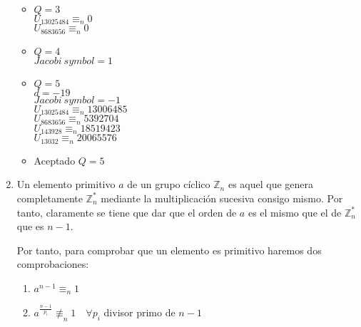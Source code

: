 \begin{enumerate}
\begin{itemize}
			\item $Q = 3$ \\
			$U_{13025484} \equiv_n 0$ \\
			$U_{8683656} \equiv_n 0$
			
			\item $Q = 4$ \\
			$Jacobi\ symbol = 1$
			
			\item $Q = 5$ \\
			$d = -19$ \\
			$Jacobi\ symbol = -1$ \\
			$U_{13025484} \equiv_n 13006485$ \\
			$U_{8683656} \equiv_n 5392704$ \\
			$U_{143928} \equiv_n 18519423$ \\
			$U_{13032} \equiv_n 20065576$
			
			\item Aceptado $Q = 5$
		\end{itemize}

		\item Un elemento primitivo $a$ de un grupo cíclico $\mathbb{Z}_n$ es aquel que genera completamente
		$\mathbb{Z}_n^*$ mediante la multiplicación sucesiva consigo mismo. Por tanto, claramente se tiene que
		dar que el orden de $a$ es el mismo que el de $\mathbb{Z}_n^*$ que es $n-1$.
		
		Por tanto, para comprobar que un elemento es primitivo haremos dos comprobaciones:
		\begin{enumerate}
			\item $a^{n-1} \equiv_n 1$
			\item $a^\frac{n-1}{p_i} \not\equiv_n 1 \quad \forall p_i$ divisor primo de $n-1$
		\end{enumerate}
		

\end{enumerate}
